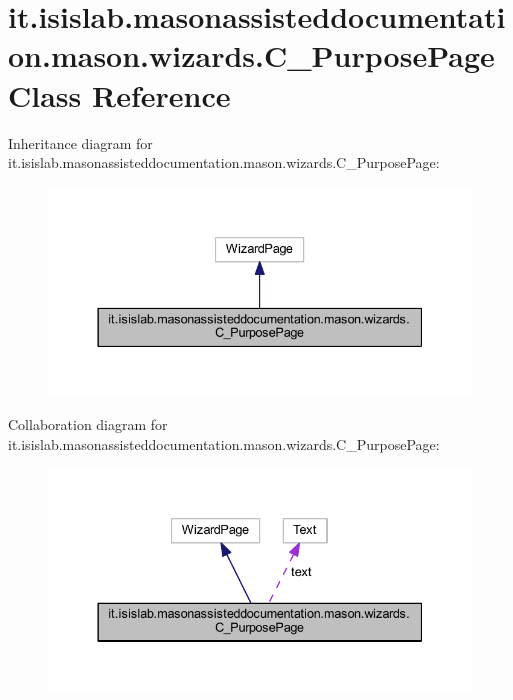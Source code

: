 \hypertarget{classit_1_1isislab_1_1masonassisteddocumentation_1_1mason_1_1wizards_1_1_c___purpose_page}{\section{it.\-isislab.\-masonassisteddocumentation.\-mason.\-wizards.\-C\-\_\-\-Purpose\-Page Class Reference}
\label{classit_1_1isislab_1_1masonassisteddocumentation_1_1mason_1_1wizards_1_1_c___purpose_page}
}


Inheritance diagram for it.\-isislab.\-masonassisteddocumentation.\-mason.\-wizards.\-C\-\_\-\-Purpose\-Page\-:
\nopagebreak
\begin{figure}[H]
\begin{center}
\leavevmode
\includegraphics[width=337pt]{classit_1_1isislab_1_1masonassisteddocumentation_1_1mason_1_1wizards_1_1_c___purpose_page__inherit__graph}
\end{center}
\end{figure}


Collaboration diagram for it.\-isislab.\-masonassisteddocumentation.\-mason.\-wizards.\-C\-\_\-\-Purpose\-Page\-:
\nopagebreak
\begin{figure}[H]
\begin{center}
\leavevmode
\includegraphics[width=337pt]{classit_1_1isislab_1_1masonassisteddocumentation_1_1mason_1_1wizards_1_1_c___purpose_page__coll__graph}
\end{center}
\end{figure}
